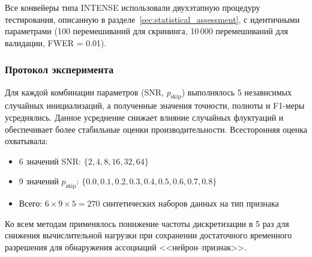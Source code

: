 Все конвейеры типа INTENSE использовали двухэтапную процедуру тестирования, описанную в
разделе~\ref{sec:statistical_assessment}, с идентичными параметрами (100 перемешиваний для скрининга,
10\,000 перемешиваний для валидации, FWER = 0.01).

\subsubsection{Протокол эксперимента}
\label{sec:experimental_protocol}

Для каждой комбинации параметров (SNR, $p_{\text{skip}}$) выполнялось 5 независимых
случайных инициализаций, а полученные значения точности, полноты и F1-меры усреднялись.
Данное усреднение снижает влияние случайных флуктуаций и обеспечивает более стабильные
оценки производительности. Всесторонняя оценка охватывала:
\begin{itemize}
\item 6 значений SNR: $\{2, 4, 8, 16, 32, 64\}$
\item 9 значений $p_{\text{skip}}$: $\{0.0, 0.1, 0.2, 0.3, 0.4, 0.5, 0.6, 0.7, 0.8\}$
\item Всего: $6 \times 9 \times 5 = 270$ синтетических наборов данных на тип признака
\end{itemize}

Ко всем методам применялось понижение частоты дискретизации в 5 раз для снижения вычислительной нагрузки
при сохранении достаточного временного разрешения для обнаружения ассоциаций <<нейрон--признак>>.
